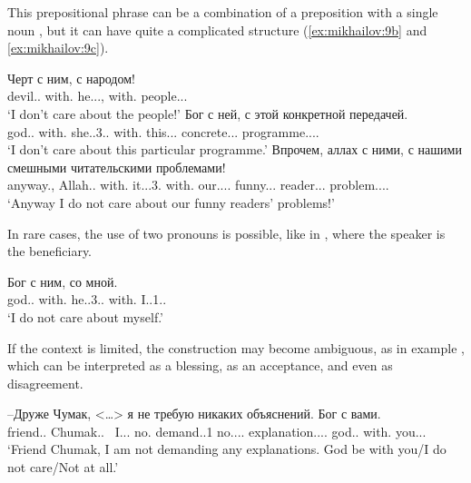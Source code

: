 \documentclass[output=paper]{langscibook}
\begin{document}
This prepositional phrase can be a combination of a preposition with a single noun , but it can have quite a complicated structure (\ref{ex:mikhailov:9b} and \ref{ex:mikhailov:9c}).


\ea\label{ex:mikhailov:9}
\ea \label{ex:mikhailov:9a}
\gll Черт с ним, с народом!\\
     devil.{\NOUN}.{\NOM} with.{\PREP} he.{\PRON}.{\INSTR}.{\SG}, with.{\PREP} people.{\PRON}.{\INSTR}.{\SG}\\
\glt `I don’t care about the people!'
\ex \label{ex:mikhailov:9b}
\gll Бог с ней, с этой конкретной передачей.\\
     god.{\NOUN}.{\NOM} with.{\PREP} she.{\PRON}.3{\F}.{\INSTR}.{\SG} with.{\PREP} this.{\PRON}.{\INSTR}.{\SG} concrete.{\ADJ}.{\INSTR}.{\SG} programme.{\NOUN}.{\F}.{\INSTR}.{\SG}\\
\glt `I don’t care about this particular programme.'
\ex \label{ex:mikhailov:9c}
\gll Впрочем, аллах с ними, с нашими смешными читательскими проблемами!\\
     anyway.{\ADV}, Allah.{\NOUN}.{\NOM} with.{\PREP} it.{\PRON}.{\INSTR}.3.{\PL} with.{\PREP} our.{\PRON}.{\POSS}.{\INSTR}.{\PL} funny.{\ADJ}.{\INSTR}.{\PL} reader.{\ADJ}.{\INSTR}.{\PL} problem.{\NOUN}.{\F}.{\INSTR}.{\PL}\\
\glt `Anyway I do not care about our funny readers’ problems!'
\z
\z

In rare cases, the use of two pronouns is possible, like in , where the speaker is the beneficiary.

\ea
\gll Бог с ним, со мной.\\
     god.{\NOUN}.{\NOM} with.{\PREP} he.{\PRON}.3{\glossM}.{\INSTR}.{\SG} with.{\PREP} I.{\PRON}.1.{\INSTR}.{\SG}\\
\glt `I do not care about myself.'
\z

If the context is limited, the construction may become ambiguous, as in example , which can be interpreted as a blessing, as an acceptance, and even as disagreement.


\ea
\gll –Друже Чумак,     <…> я не требую никаких объяснений. Бог с вами.\\
    friend.{\NOUN}.{\VOC} Chumak.{\NOUNPROPER}.{\NOM}  ~I.{\PRON}.{\NOM}.{\SG} no.{\PTCP} demand.{\PRES}.1{\SG} no.{\PRON}.{\NEG}.{\GEN}.{\PL} explanation.{\NOUN}.{\GEN}.{\PL}. god.{\NOUN}.{\NOM} with.{\PREP} you.{\PRON}.{\INSTR}.{\PL}\\
\glt `Friend Chumak, I am not demanding any explanations. God be with you\slash I do not care\slash Not at all.'
\z
\end{document}
